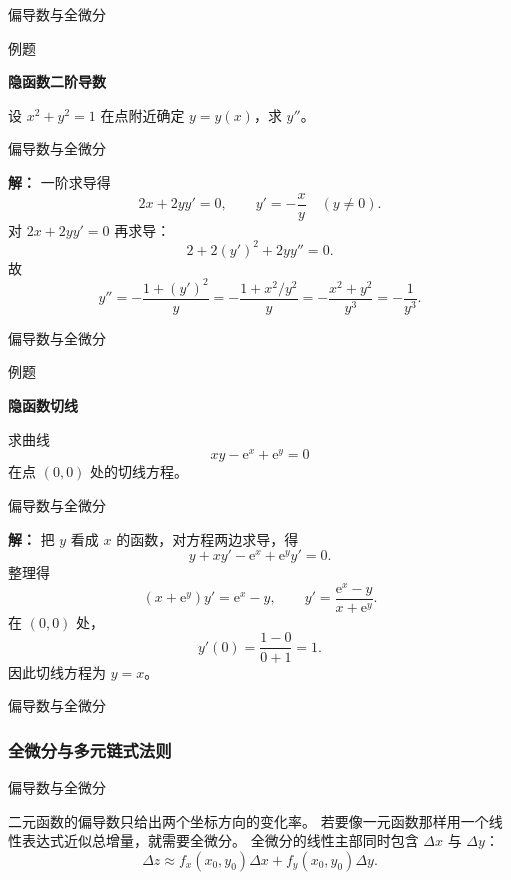 \documentclass[aspectratio=169,10pt,fontset=fandol]{ctexbeamer}
\newcommand{\ee}{\mathrm{e}}
\begin{document}
\begin{frame}[t,fragile]{偏导数与全微分}
\footnotesize
\begin{block}{例题}
{\footnotesize
\textbf{隐函数二阶导数}\par

	设 $x^2+y^2=1$ 在点附近确定 $y=y(x)$，求 $y''$。

}
\end{block}
\end{frame}
\begin{frame}[t,fragile]{偏导数与全微分}
\footnotesize
{\footnotesize
\textbf{解：}
一阶求导得
	\[
	2x+2yy'=0,\qquad y'=-\frac{x}{y}\quad(y\neq0).
	\]
	对 $2x+2yy'=0$ 再求导：
	\[
	2+2(y')^2+2yy''=0.
	\]
	故
	\[
	y''=-\frac{1+(y')^2}{y}=-\frac{1+x^2/y^2}{y}
	=-\frac{x^2+y^2}{y^3}=-\frac1{y^3}.
	\]

}
\end{frame}
\begin{frame}[t,fragile]{偏导数与全微分}
\footnotesize
\begin{block}{例题}
{\footnotesize
\textbf{隐函数切线}\par

	求曲线
	\[
	xy-\ee^x+\ee^y=0
	\]
	在点 $(0,0)$ 处的切线方程。

}
\end{block}
\end{frame}
\begin{frame}[t,fragile]{偏导数与全微分}
\footnotesize
{\footnotesize
\textbf{解：}
把 $y$ 看成 $x$ 的函数，对方程两边求导，得
	\[
	y+xy'-\ee^x+\ee^y y'=0.
	\]
	整理得
	\[
	(x+\ee^y)y'=\ee^x-y,\qquad
	y'=\frac{\ee^x-y}{x+\ee^y}.
	\]
	在 $(0,0)$ 处，
	\[
	y'(0)=\frac{1-0}{0+1}=1.
	\]
	因此切线方程为 $y=x$。

}
\end{frame}
\begin{frame}[t,fragile]{偏导数与全微分}
\footnotesize
{\footnotesize
\subsubsection*{全微分与多元链式法则}


}
\end{frame}
\begin{frame}[t,fragile]{偏导数与全微分}
\footnotesize
{\footnotesize
二元函数的偏导数只给出两个坐标方向的变化率。 若要像一元函数那样用一个线性表达式近似总增量，就需要全微分。 全微分的线性主部同时包含 $\Delta x$ 与 $\Delta y$：
\[
\Delta z\approx f_x(x_0,y_0)\Delta x+f_y(x_0,y_0)\Delta y.
\]


}
\end{frame}
\end{document}
